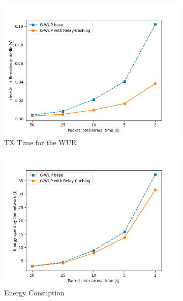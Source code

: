 \begin{figure}[H]
  \begin{subfigure}[t]{0.49\linewidth}
    \includegraphics[width=1.1\linewidth]{Contents/Images/graphs/relayCaching/tx_time.png}
    \caption{TX Time for the WUR}
    \label{fig:TXTime_2}
  \end{subfigure}
  \begin{subfigure}[t]{0.49\linewidth}
    \includegraphics[width=1.1\linewidth]{Contents/Images/graphs/relayCaching/energySpent.png}
    \caption{Energy Consuption}
    \label{fig:EnergySpent_2}
  \end{subfigure}
  \begin{subfigure}[t]{0.49\linewidth}

\end{subfigure}
\end{figure}

